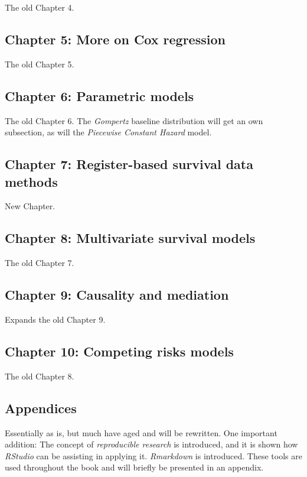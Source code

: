 \documentclass[a4paper,11pt]{article}
\begin{document}
The old Chapter 4.

\subsection*{Chapter 5: More on Cox regression}

The old Chapter 5.

\subsection*{Chapter 6: Parametric models}

The old Chapter 6. The \emph{Gompertz} baseline distribution will get an
own subsection, as will the \emph{Piecewise Constant Hazard} model.

\subsection*{Chapter 7: Register-based survival data methods}

New Chapter.

\subsection*{Chapter 8: Multivariate survival models}

The old Chapter 7.

\subsection*{Chapter 9: Causality and mediation}

Expands the old Chapter 9.

\subsection*{Chapter 10: Competing risks models}

The old Chapter 8.

\subsection*{Appendices}

Essentially as is, but much have aged and will be rewritten. One important addition:
The concept of \emph{reproducible research} is
introduced, and it is shown how \emph{RStudio} can be assisting in applying
it. \emph{Rmarkdown} is introduced. These tools are used throughout the
book and will briefly be presented in an appendix.



\end{document}
